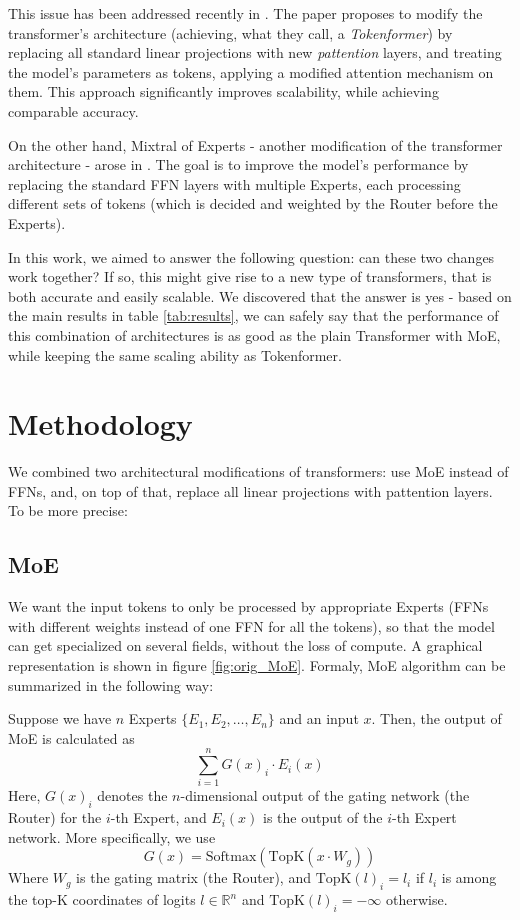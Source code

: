 \documentclass[twoside,11pt]{article}
\begin{document}
This issue has been addressed recently in \cite{Tokenformer}. The paper proposes to modify the transformer's architecture (achieving, what they call, a \textit{Tokenformer}) by replacing all standard linear projections with new \textit{pattention} layers, and treating the model's parameters as tokens, applying a modified attention mechanism on them. This approach significantly improves scalability, while achieving comparable accuracy.

On the other hand, Mixtral of Experts - another modification of the transformer architecture - arose in \cite{MoE}. The goal is to improve the model's performance by replacing the standard FFN layers with multiple Experts, each processing different sets of tokens (which is decided and weighted by the Router before the Experts).

In this work, we aimed to answer the following question: can these two changes work together? If so, this might give rise to a new type of transformers, that is both accurate and easily scalable. We discovered that the answer is yes - based on the main results in table \ref{tab:results}, we can safely say that the performance of this combination of architectures is as good as the plain Transformer with MoE, while keeping the same scaling ability as Tokenformer.









\section{Methodology}

We combined two architectural modifications of transformers: use MoE instead of FFNs, and, on top of that, replace all linear projections with pattention layers. To be more precise:

\subsection{MoE}

We want the input tokens to only be processed by appropriate Experts (FFNs with different weights instead of one FFN for all the tokens), so that the model can get specialized on several fields, without the loss of compute. A graphical representation is shown in figure \ref{fig:orig_MoE}. Formaly, MoE algorithm can be summarized in the following way:

Suppose we have $n$ Experts $\{E_1, E_2, \ldots, E_n\}$ and an input $x$. Then, the output of MoE is calculated as
$$\sum_{i=1}^n G(x)_i \cdot E_i(x)$$
Here, $G(x)_i$ denotes the $n$-dimensional output of the gating network (the Router) for the $i$-th Expert, and $E_i(x)$ is the output of the $i$-th Expert network. More specifically, we use
$$G(x) = \text{Softmax}(\text{TopK}(x \cdot W_g))$$
Where $W_g$ is the gating matrix (the Router), and $\text{TopK}(l)_i = l_i$ if $l_i$ is among the top-K coordinates of logits $l \in \mathbb{R}^n$ and $\text{TopK}(l)_i = - \infty$ otherwise.
\end{document}
